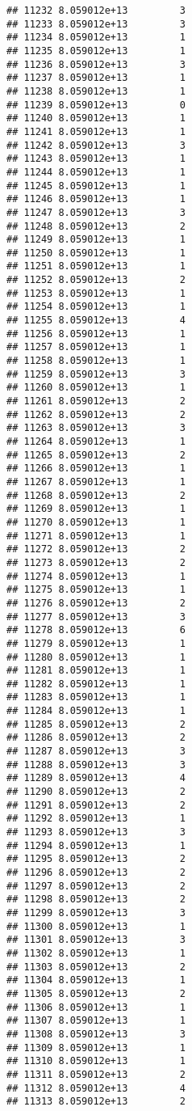 \documentclass[
]{article}
\begin{document}
\begin{verbatim}
## 11232 8.059012e+13         3
## 11233 8.059012e+13         3
## 11234 8.059012e+13         1
## 11235 8.059012e+13         1
## 11236 8.059012e+13         3
## 11237 8.059012e+13         1
## 11238 8.059012e+13         1
## 11239 8.059012e+13         0
## 11240 8.059012e+13         1
## 11241 8.059012e+13         1
## 11242 8.059012e+13         3
## 11243 8.059012e+13         1
## 11244 8.059012e+13         1
## 11245 8.059012e+13         1
## 11246 8.059012e+13         1
## 11247 8.059012e+13         3
## 11248 8.059012e+13         2
## 11249 8.059012e+13         1
## 11250 8.059012e+13         1
## 11251 8.059012e+13         1
## 11252 8.059012e+13         2
## 11253 8.059012e+13         1
## 11254 8.059012e+13         1
## 11255 8.059012e+13         4
## 11256 8.059012e+13         1
## 11257 8.059012e+13         1
## 11258 8.059012e+13         1
## 11259 8.059012e+13         3
## 11260 8.059012e+13         1
## 11261 8.059012e+13         2
## 11262 8.059012e+13         2
## 11263 8.059012e+13         3
## 11264 8.059012e+13         1
## 11265 8.059012e+13         2
## 11266 8.059012e+13         1
## 11267 8.059012e+13         1
## 11268 8.059012e+13         2
## 11269 8.059012e+13         1
## 11270 8.059012e+13         1
## 11271 8.059012e+13         1
## 11272 8.059012e+13         2
## 11273 8.059012e+13         2
## 11274 8.059012e+13         1
## 11275 8.059012e+13         1
## 11276 8.059012e+13         2
## 11277 8.059012e+13         3
## 11278 8.059012e+13         6
## 11279 8.059012e+13         1
## 11280 8.059012e+13         1
## 11281 8.059012e+13         1
## 11282 8.059012e+13         1
## 11283 8.059012e+13         1
## 11284 8.059012e+13         1
## 11285 8.059012e+13         2
## 11286 8.059012e+13         2
## 11287 8.059012e+13         3
## 11288 8.059012e+13         3
## 11289 8.059012e+13         4
## 11290 8.059012e+13         2
## 11291 8.059012e+13         2
## 11292 8.059012e+13         1
## 11293 8.059012e+13         3
## 11294 8.059012e+13         1
## 11295 8.059012e+13         2
## 11296 8.059012e+13         2
## 11297 8.059012e+13         2
## 11298 8.059012e+13         2
## 11299 8.059012e+13         3
## 11300 8.059012e+13         1
## 11301 8.059012e+13         3
## 11302 8.059012e+13         1
## 11303 8.059012e+13         2
## 11304 8.059012e+13         1
## 11305 8.059012e+13         2
## 11306 8.059012e+13         1
## 11307 8.059012e+13         1
## 11308 8.059012e+13         3
## 11309 8.059012e+13         1
## 11310 8.059012e+13         1
## 11311 8.059012e+13         2
## 11312 8.059012e+13         4
## 11313 8.059012e+13         2

\end{verbatim}
\end{document}
